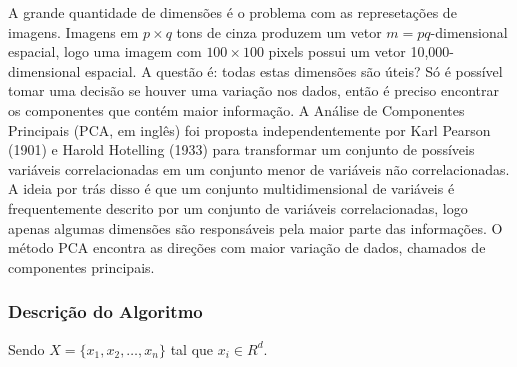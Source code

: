 A grande quantidade de dimensões é o problema com as represetações de imagens. Imagens em $p \times q$ tons de cinza produzem um vetor $m = pq$-dimensional espacial, logo uma imagem com $100 \times 100$ pixels possui um vetor 10,000-dimensional espacial. A questão é: todas estas dimensões são úteis? Só é possível tomar uma decisão se houver uma variação nos dados, então é preciso encontrar os componentes que contém maior informação. A Análise de Componentes Principais (PCA, em inglês) foi proposta independentemente por Karl Pearson (1901) e Harold Hotelling (1933) para transformar um conjunto de possíveis variáveis correlacionadas em um conjunto menor de variáveis não correlacionadas. A ideia por trás disso é que um conjunto multidimensional de variáveis é frequentemente descrito por um conjunto de variáveis correlacionadas, logo apenas algumas dimensões são responsáveis pela maior parte das informações. O método PCA encontra as direções com maior variação de dados, chamados de componentes principais.

\subsubsection*{Descrição do Algoritmo} %

Sendo $X = \{ x_{1}, x_{2}, \ldots, x_{n} \}$ tal que $x_i \in R^{d}$.

